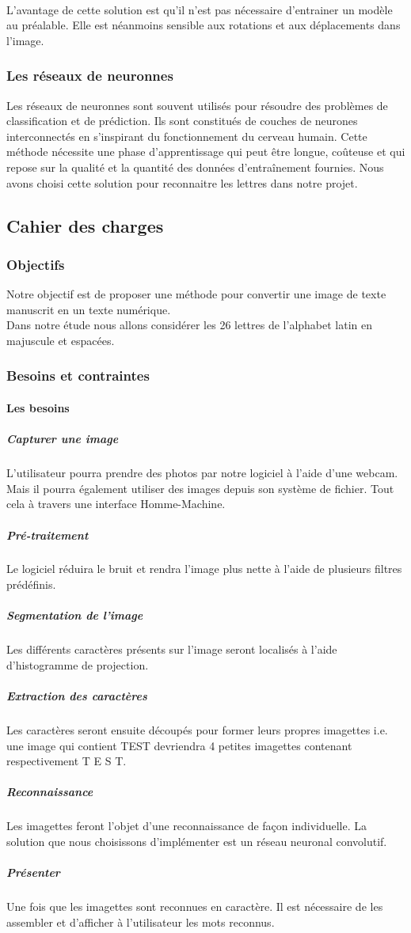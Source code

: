 \documentclass[a4paper]{article}
\begin{document}
				\paragraph{} L'avantage de cette solution est qu'il n'est pas nécessaire d'entrainer un modèle au préalable. Elle est néanmoins sensible aux rotations et aux déplacements dans l'image.%
			\subsubsection{Les réseaux de neuronnes} 
				Les réseaux de neuronnes sont souvent utilisés pour résoudre des problèmes de classification et de prédiction.
				Ils sont constitués de couches de neurones interconnectés en s'inspirant du fonctionnement du cerveau humain.
				Cette méthode nécessite une phase d'apprentissage qui peut être longue, coûteuse et qui repose sur la qualité et la quantité des données d'entraînement fournies.
				Nous avons choisi cette solution pour reconnaitre les lettres dans notre projet.

		\subsection{Cahier des charges}

			\subsubsection{Objectifs}
			Notre objectif est de proposer une méthode pour convertir une image de texte manuscrit en un texte numérique.\\
			Dans notre étude nous allons considérer les 26 lettres de l'alphabet latin en majuscule et espacées.


			\subsubsection{Besoins et contraintes}
				\paragraph{Les besoins}
					\subparagraph{Capturer une image}
						L'utilisateur pourra prendre des photos par notre logiciel à l'aide d'une webcam. Mais il pourra également utiliser des images depuis son système de fichier. Tout cela à travers une interface Homme-Machine.
					\subparagraph{Pré-traitement}
						Le logiciel réduira le bruit et rendra l'image plus nette à l'aide de plusieurs filtres prédéfinis. 
					\subparagraph{Segmentation de l'image}
						Les différents caractères présents sur l'image seront localisés à l'aide d'histogramme de projection.
					\subparagraph{Extraction des caractères}
						Les caractères seront ensuite découpés pour former leurs propres imagettes i.e. une image qui contient TEST devriendra 4 petites imagettes contenant respectivement T E S T.
					\subparagraph{Reconnaissance}
						Les imagettes feront l'objet d'une reconnaissance de façon individuelle. La solution que nous choisissons d'implémenter est un réseau neuronal convolutif.
					\subparagraph{Présenter}
						Une fois que les imagettes sont reconnues en caractère. Il est nécessaire de les assembler et d'afficher à l'utilisateur les mots reconnus.
\end{document}
